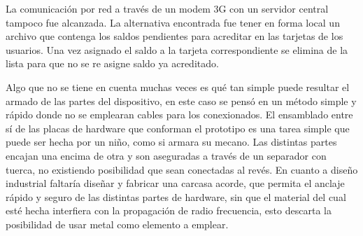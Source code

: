 \bigskip
La comunicación por red a través de un modem 3G con un servidor central
tampoco fue alcanzada. La alternativa encontrada fue tener en forma local
un archivo que contenga los saldos pendientes para acreditar en las tarjetas
de los usuarios. Una vez asignado el saldo a la tarjeta correspondiente 
se elimina de la lista para que no se re asigne saldo ya acreditado.

\bigskip
Algo que no se tiene en cuenta muchas veces es qué tan simple puede resultar
el armado de las partes del dispositivo, en este caso se pensó en un 
método simple y rápido donde no se emplearan cables para los conexionados.
El ensamblado entre sí de las placas de hardware que conforman el prototipo es 
una tarea simple que puede ser hecha por un niño, como si armara su mecano.
Las distintas partes encajan una encima de otra y son aseguradas a través
de un separador con tuerca, no existiendo posibilidad que sean conectadas al 
revés. En cuanto a diseño industrial faltaría diseñar y fabricar una 
carcasa acorde, que permita el anclaje rápido y seguro de las distintas
partes de hardware, sin que el material del cual esté hecha interfiera
con la propagación de radio frecuencia, esto descarta la posibilidad de
usar metal como elemento a emplear.